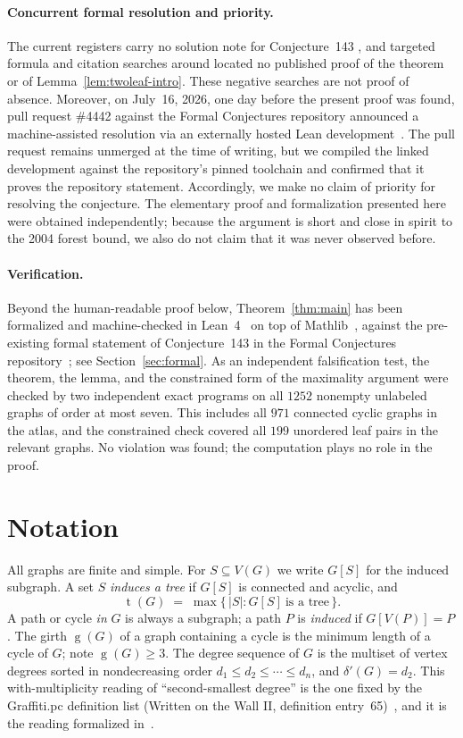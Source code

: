 \documentclass[11pt]{article}
\numberwithin{equation}{section}
\theoremstyle{remark}
\newcommand{\tr}{\operatorname{t}}
\newcommand{\gr}{\operatorname{g}}
\newcommand{\dd}{\delta'}
\begin{document}
\paragraph{Concurrent formal resolution and priority.}
The current registers carry no solution note for Conjecture~143
\cite{WestReg,FC143}, and targeted formula and citation searches around
\cite{ESS86,DW04,HMS14} located no published proof of the theorem or of
Lemma~\ref{lem:twoleaf-intro}.  These negative searches are not proof of
absence.  Moreover, on July~16, 2026, one day before the present proof was
found, pull request \#4442 against the Formal Conjectures repository
announced a machine-assisted resolution via an externally hosted Lean
development~\cite{FC4442}.  The pull request remains unmerged at the time of
writing, but we compiled the linked development against the repository's
pinned toolchain and confirmed that it proves the repository statement.
Accordingly, we make no claim of priority for resolving the conjecture.  The
elementary proof and formalization presented here were obtained independently;
because the argument is short and close in spirit to the 2004 forest bound,
we also do not claim that it was never observed before.

\paragraph{Verification.}
Beyond the human-readable proof below, Theorem~\ref{thm:main} has been
formalized and machine-checked in Lean~4~\cite{Lean4} on top of
Mathlib~\cite{mathlib}, against the pre-existing formal statement of
Conjecture~143 in the Formal Conjectures repository~\cite{FC143}; see
Section~\ref{sec:formal}.  As an independent falsification test, the theorem,
the lemma, and the constrained form of the maximality argument were checked by
two independent exact programs on all $1252$ nonempty unlabeled graphs of
order at most seven.  This includes all $971$ connected cyclic graphs in the
atlas, and the constrained check covered all $199$ unordered leaf pairs in
the relevant graphs.  No violation was found; the computation plays no role
in the proof.

\section{Notation}

All graphs are finite and simple.  For $S\subseteq V(G)$ we write $G[S]$ for
the induced subgraph.  A set $S$ \emph{induces a tree} if $G[S]$ is connected
and acyclic, and
\[
  \tr(G)\;=\;\max\{\,|S| : G[S]\ \text{is a tree}\,\}.
\]
A path or cycle \emph{in} $G$ is always a subgraph; a path $P$ is
\emph{induced} if $G[V(P)]=P$.  The girth $\gr(G)$ of a graph containing a
cycle is the minimum length of a cycle of $G$; note $\gr(G)\ge3$.  The degree
sequence of $G$ is the multiset of vertex degrees sorted in nondecreasing
order $d_1\le d_2\le\cdots\le d_n$, and $\dd(G)=d_2$.  This with-multiplicity
reading of ``second-smallest degree'' is the one fixed by the Graffiti.pc
definition list (Written on the Wall II, definition entry~65)~\cite{WOWII},
and it is the reading formalized in~\cite{FC143}.
\end{document}
